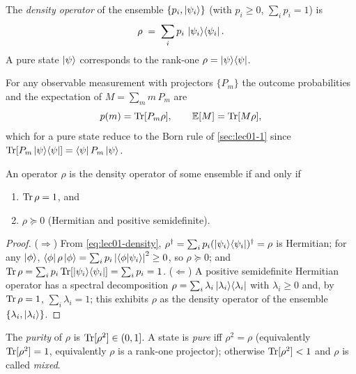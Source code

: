 \begin{definition}\label{def:lec01-density}
The \emph{density operator} of the ensemble $\{p_i,\ket{\psi_i}\}$ (with $p_i\ge0$,
$\sum_i p_i=1$) is
\begin{equation}\label{eq:lec01-density}
  \rho\;=\;\sum_i p_i\,\ket{\psi_i}\!\bra{\psi_i}.
\end{equation}
A pure state $\ket{\psi}$ corresponds to the rank-one $\rho=\ket{\psi}\!\bra{\psi}$.
\end{definition}

For any observable measurement with projectors $\{P_m\}$ the outcome probabilities
and the expectation of $M=\sum_m m\,P_m$ are
\begin{equation}\label{eq:lec01-bornrho}
  p(m)=\operatorname{Tr}[P_m\rho],\qquad \mathbb{E}[M]=\operatorname{Tr}[M\rho],
\end{equation}
which for a pure state reduce to the Born rule of \cref{sec:lec01-1} since
$\operatorname{Tr}[P_m\ket{\psi}\!\bra{\psi}]=\bra{\psi}P_m\ket{\psi}$.

\begin{proposition}\label{prop:lec01-densitychar}
An operator $\rho$ is the density operator of some ensemble if and only if
\begin{enumerate}[label=(\roman*)]
  \item $\operatorname{Tr}\rho=1$, and
  \item $\rho\succeq0$ (Hermitian and positive semidefinite).
\end{enumerate}
\end{proposition}

\begin{proof}
($\Rightarrow$) From \eqref{eq:lec01-density}, $\rho^{\dagger}=\sum_i p_i(\ket{\psi_i}\!\bra{\psi_i})^{\dagger}=\rho$
is Hermitian; for any $\ket{\phi}$, $\bra{\phi}\rho\ket{\phi}=\sum_i p_i\left\lvert \braket{\phi|\psi_i} \right\rvert^{2}\ge0$,
so $\rho\succeq0$; and $\operatorname{Tr}\rho=\sum_i p_i\operatorname{Tr}[\ket{\psi_i}\!\bra{\psi_i}]=\sum_i p_i=1$.
($\Leftarrow$) A positive semidefinite Hermitian operator has a spectral
decomposition $\rho=\sum_i\lambda_i\ket{\lambda_i}\!\bra{\lambda_i}$ with $\lambda_i\ge0$ and, by
$\operatorname{Tr}\rho=1$, $\sum_i\lambda_i=1$; this exhibits $\rho$ as the density operator of the
ensemble $\{\lambda_i,\ket{\lambda_i}\}$.
\end{proof}

\begin{definition}\label{def:lec01-purity}
The \emph{purity} of $\rho$ is $\operatorname{Tr}[\rho^{2}]\in(0,1]$. A state is \emph{pure} iff
$\rho^{2}=\rho$ (equivalently $\operatorname{Tr}[\rho^{2}]=1$, equivalently $\rho$ is a rank-one
projector); otherwise $\operatorname{Tr}[\rho^{2}]<1$ and $\rho$ is called \emph{mixed}.
\end{definition}

